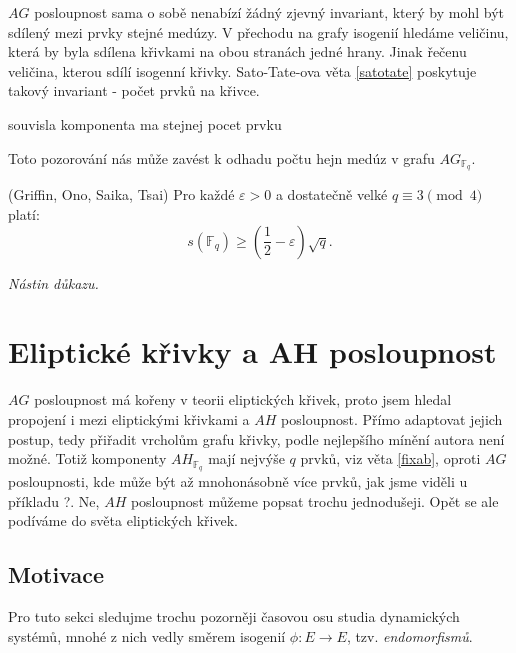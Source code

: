 \documentclass[12pt]{report}
\begin{document}
$AG$ posloupnost sama o sobě nenabízí žádný zjevný invariant, který by mohl být sdílený mezi prvky stejné medúzy. V přechodu na grafy isogenií hledáme veličinu, která by byla sdílena křivkami na obou stranách jedné hrany. Jinak řečenu veličina, kterou sdílí isogenní křivky. Sato-Tate-ova věta \ref{satotate} poskytuje takový invariant - počet prvků na křivce. 

\begin{veta}
souvisla komponenta ma stejnej pocet prvku
\end{veta}


Toto pozorování nás může zavést k odhadu počtu hejn medúz v grafu $AG_{\mathbb{F}_q}$.


\begin{veta}(Griffin, Ono, Saika, Tsai)
Pro každé $\varepsilon>0$ a dostatečně velké $q \equiv 3 \pmod{4}$ platí:
$$s(\mathbb{F}_q) \geqslant \left(\frac{1}{2} - \varepsilon \right) \sqrt{q}.$$
\end{veta}
\noindent \textit{Nástin důkazu.}



\chapter{Eliptické křivky a AH posloupnost}\label{5}

$AG$ posloupnost má kořeny v teorii eliptických křivek, proto jsem hledal propojení i mezi eliptickými křivkami a $AH$ posloupnost.
Přímo adaptovat jejich postup, tedy přiřadit vrcholům grafu křivky, podle nejlepšího mínění autora není možné. Totiž komponenty $AH_{\mathbb{F}_q}$ mají nejvýše $q$ prvků, viz věta \ref{fixab}, oproti $AG$ posloupnosti, kde může být až mnohonásobně více prvků, jak jsme viděli u příkladu ?.  Ne, $AH$ posloupnost můžeme popsat trochu jednodušeji. Opět se ale podíváme do světa eliptických křivek. 

\section{Motivace}

Pro tuto sekci sledujme trochu pozorněji časovou osu studia dynamických systémů, mnohé z nich vedly směrem isogenií $\phi : E \longrightarrow E$, tzv. \textit{endomorfismů}.
\end{document}
